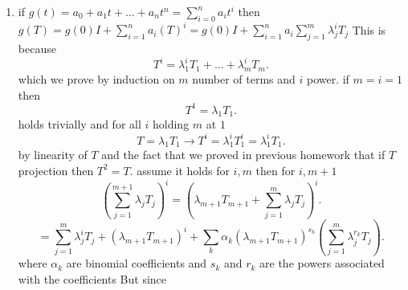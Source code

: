 \documentclass{article}
\begin{document}
        \begin{enumerate}[label = (\alph*)]
            \item if $g(t) = a_0 + a_1t + ... + a_nt^{n} = \sum_{i=0}^{n}a_it^{i}$ then $g(T) = g(0)I + \sum_{i=1}^{n}a_i(T)^{i} = g(0)I + \sum_{i=1}^{n}a_i \sum_{j=1}^{m}\lambda_j^{i}T_j$
                This is because
                \[
                T^{i} = \lambda_1^{i}T_1 + ... + \lambda_m^{i}T_m
                .\] which we prove by induction on $m$ number of terms and $i$ power. if $m = i = 1$
                then
                \[
                T^{1} = \lambda_1T_1
                .\] 
                holds trivially
                and for all $i$ holding  $m$ at $1$
                 \[
                T= \lambda_1T_1 \rightarrow T^{i} = \lambda_1^{i}T_1^{i} = \lambda_1^{i}T_1
                .\] 
                by linearity of $T$ and the fact that we proved in previous homework that if $T$ projection then $T^2 = T$.
                assume it holds for $i,m$ then  for $i,m+1$
                \[
                    (\sum_{j=1}^{m+1}\lambda_jT_j)^{i} = (\lambda_{m+1}T_{m+1} + \sum_{j=1}^{m}\lambda_jT_j)^{i}
                .\] 
                \[
                    = \sum_{j=1}^{m}\lambda_j^{i}T_j + (\lambda_{m+1}T_{m+1})^{i} + \sum_{k}^{}\alpha_k(\lambda_{m+1}T_{m+1})^{s_k}(\sum_{j=1}^{m}\lambda_j^{r_k}T_j)
                .\] 
                where $\alpha_k$ are binomial coefficients and $s_k$ and $r_k$ are the powers associated with the coefficients
                But since


\end{enumerate}
\end{document}
